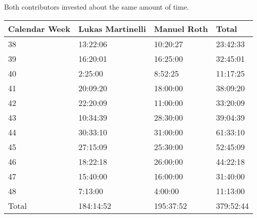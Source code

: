 Both contributors invested about the same amount of time.

\begin{center}
    \begin{tabular}{llll}
    \hline
     Calendar Week & Lukas Martinelli & Manuel Roth & Total    \\
    \hline
    38     & 13:22:06         & 10:20:27    & 23:42:33  \\
    39     & 16:20:01         & 16:25:00    & 32:45:01  \\
    40     & 2:25:00          & 8:52:25     & 11:17:25  \\
    41     & 20:09:20         & 18:00:00    & 38:09:20  \\
    42     & 22:20:09         & 11:00:00    & 33:20:09  \\
    43     & 10:34:39         & 28:30:00    & 39:04:39  \\
    44     & 30:33:10         & 31:00:00    & 61:33:10  \\
    45     & 27:15:09         & 25:30:00    & 52:45:09  \\
    46     & 18:22:18         & 26:00:00    & 44:22:18  \\
    47     & 15:40:00         & 16:00:00    & 31:40:00  \\
    48     & 7:13:00          & 4:00:00     & 11:13:00  \\
    \hline
    Total & 184:14:52        & 195:37:52   & 379:52:44 \\
    \end{tabular}
\end{center}